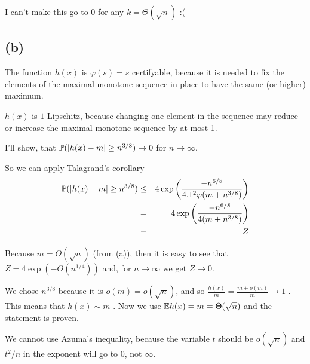 \documentclass[a4paper]{article}
\begin{document}
I can't make this go to $ 0 $ for any $ k = \Theta(\sqrt{n}) $ :(

\subsection*{(b)}

The function $ h(x) $ is $ \varphi(s) = s $ certifyable, because it is needed
to fix the elements of the maximal monotone sequence in place to have the same
(or higher) maximum.

$ h(x) $ is $ 1 $-Lipschitz, because changing one element in the sequence may
reduce or increase the maximal monotone sequence by at most 1.

I'll show, that $ \P(|h(x) - m| \ge n^{3/8}) \to 0 $ for $ n \to \infty $.

So we can apply Talagrand's corollary
\begin{eqnarray*}
\P(|h(x) - m| \ge n^{3/8})
  &\le& 4\exp\B{\frac{-n^{6/8}}{4.1^2\varphi(m+n^{3/8})}} \\
  &=& 4\exp\B{\frac{-n^{6/8}}{4(m+n^{3/8})}} \\
  &=& Z \\
\end{eqnarray*}

Because $ m = \Theta(\sqrt{n}) $ (from (a)), then it is easy to see that
$ Z = 4\exp(-\Theta(n^{1/4})) $ and, for $ n \to \infty $ we get $ Z \to 0 $.

We chose $ n^{3/8} $ because it is $ o(m) = o(\sqrt{n}) $, and so
$ \frac{h(x)}{m} = \frac{m + o(m)}{m} \to 1 $ \as. This means that $ h(x)
\sim m $ \aas. Now we use $ \E h(x) = m = \Theta(\sqrt{n}) $ and the statement
is proven.

We cannot use Azuma's inequality, because the variable $ t $ should be
$ o(\sqrt{n}) $ and $ t^2 / n $ in  the exponent will go to $ 0 $, not $ \infty
$.
\end{document}
